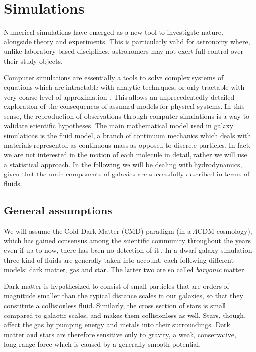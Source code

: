 
\chapter{Simulations}
\label{ch:simulations}

Numerical simulations have emerged as a new tool to investigate nature, alongside theory and experiments.
This is particularly valid for astronomy where, unlike laboratory-based disciplines, astronomers may not exert full control over their study objects\citep{Heng2014}.

Computer simulations are essentially a tools to solve complex systems of equations which are intractable with analytic techniques, or only tractable with very coarse level of approximation \citep{Springel2015}.
This allows an unprecedentedly detailed exploration of the consequences of assumed models for physical systems.
In this sense, the reproduction of observations through computer simulations is a way to validate scientific hypotheses.
The main mathematical model used in galaxy simulations is the fluid model, a branch of continuum mechanics which deals with materials represented as continuous mass as opposed to discrete particles.
In fact, we are not interested in the motion of each molecule in detail, rather we will use a statistical approach. 
In the following we will be dealing with hydrodynamics, given that the main components of galaxies are successfully described in terms of fluids.

\section{General assumptions}
We will assume the Cold Dark Matter (CMD) paradigm (in a $\Lambda$CDM cosmology), which has gained consensus among the scientific community throughout the years even if up to now, there has been no detection of it \citep[see e.g.][for an extensive and historical overview]{Einasto2010}.
In a dwarf galaxy simulation three kind of fluids are generally taken into account, each following different models: dark matter, gas and star. The latter two are so called \emph{baryonic} matter.

Dark matter is hypothesized to consist of small particles that are orders of magnitude smaller than the typical distance scales in our galaxies, so that they constitute a collisionless fluid.
Similarly, the cross section of stars is small compared to galactic scales, and makes them collisionless as well.
Stars, though, affect the gas by pumping energy and metals into their surroundings.
Dark matter and stars are therefore sensitive only to gravity, a weak, conservative, long-range force which is caused by a generally smooth potential.

